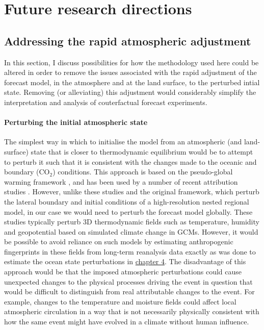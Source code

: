 \section{Future research directions}\label{discussion:future}

  \subsection{Addressing the rapid atmospheric adjustment}

    In this section, I discuss possibilities for how the methodology used here could be altered in order to remove the issues associated with the rapid adjustment of the forecast model, in the atmosphere and at the land surface, to the perturbed intial state. Removing (or alleviating) this adjustment would considerably simplify the interpretation and analysis of couterfactual forecast experiments.

    \paragraph*{Perturbing the initial atmospheric state}

      The simplest way in which to initialise the model from an atmospheric (and land-surface) state that is closer to thermodynamic equilibrium would be to attempt to perturb it such that it is consistent with the changes made to the oceanic and boundary (CO$_2$) conditions. This approach is based on the pseudo-global warming framework \citep{schar_surrogate_1996}, and has been used by a number of recent attribution studies \citep[][]{pall_diagnosing_2017,patricola_anthropogenic_2018,wehner_estimating_2019,reed_forecasted_2020,reed_attribution_2022}. However, unlike these studies and the original framework, which perturb the lateral boundary and initial conditions of a high-resolution nested regional model, in our case we would need to perturb the forecast model globally. These studies typically perturb 3D thermodynamic fields such as temperature, humidity and geopotential based on simulated climate change in GCMs. However, it would be possible to avoid reliance on such models by estimating anthropogenic fingerprints in these fields from long-term reanalysis data \cite{hersbach_era5_2020,laloyaux_cera-20c_2018} exactly as was done to estimate the ocean state perturbations in \hyperref[ch4]{chapter 4}. The disadvantage of this approach would be that the imposed atmospheric perturbations could cause unexpected changes to the physical processes driving the event in question that would be difficult to distinguish from real attributable changes to the event. For example, changes to the temperature and moisture fields could affect local atmospheric circulation in a way that is not necessarily physically consistent with how the same event might have evolved in a climate without human influence.


